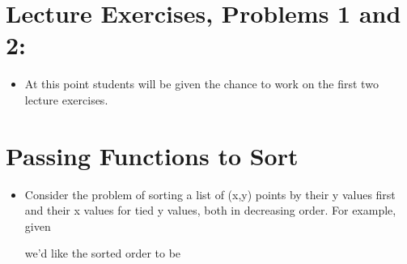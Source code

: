 \documentclass[letterpaper,10pt,english]{sphinxmanual}
\begin{document}
\section{Lecture Exercises, Problems 1 and 2:}
\label{\detokenize{lecture_notes/lec24_functional:lecture-exercises-problems-1-and-2}}\begin{itemize}
\item {} 
At this point students will be given the chance to work on the
first two lecture exercises.

\end{itemize}


\section{Passing Functions to Sort}
\label{\detokenize{lecture_notes/lec24_functional:passing-functions-to-sort}}\begin{itemize}
\item {} 
Consider the problem of sorting a list of (x,y) points by their y
values first and their x values for tied y values, both in
decreasing order.  For example, given

%
\begin{sphinxVerbatim}[commandchars=\\\{\}]
  \PYG{p}{[}         \PYGZbs{}
            \PYG{p}{]}
\end{sphinxVerbatim}

we’d like the sorted order to be

%
\begin{sphinxVerbatim}[commandchars=\\\{\}]
\PYG{p}{[}            \PYGZbs{}
        \PYG{p}{]}
\end{sphinxVerbatim}


\end{itemize}
\end{document}
